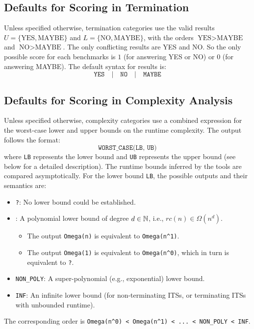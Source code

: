 \subsection{Defaults for Scoring in Termination}\label{scoring_termination}

Unless specified otherwise, termination categories use the valid results $U = \{\text{YES}, \text{MAYBE}\}$ and $L = \{\text{NO}, \text{MAYBE}\}$, with the orders $\text{YES} > \text{MAYBE}$ and $\text{NO} > \text{MAYBE}$.
%
The only conflicting results are YES and NO.
%
So the only possible score for each benchmarks is $1$ (for answering YES or NO) or $0$ (for answering MAYBE).
%
The default syntax for results is:
\[
  \texttt{YES} \quad | \quad \texttt{NO} \quad | \quad \texttt{MAYBE}
\]

\subsection{Defaults for Scoring in Complexity Analysis}\label{scoring_complexity}

Unless specified otherwise, complexity categories use a combined expression for the worst-case lower and upper bounds on the runtime complexity.
%
The output follows the format:
\[
  \texttt{WORST\_CASE(LB, UB)}
\]
where \texttt{LB} represents the lower bound and \texttt{UB} represents the upper bound (see below for a detailed description).
%
The runtime bounds inferred by the tools are compared asymptotically.
%
For the lower bound \texttt{LB}, the possible outputs and their semantics are:
\begin{itemize}
    \item \texttt{?}: No lower bound could be established.
    \item {}: A polynomial lower bound of degree $d \in \mathbb{N}$, i.e., $rc(n) \in \Omega(n^d)$.
      \begin{itemize}
      \item The output \texttt{Omega(n)} is equivalent to \texttt{Omega(n\textasciicircum 1)}.
      \item The output \texttt{Omega(1)} is equivalent to \texttt{Omega(n\textasciicircum 0)}, which in turn is equivalent to \texttt{?}.
      \end{itemize}
    \item \texttt{NON\_POLY}: A super-polynomial (e.g., exponential) lower bound.
    \item \texttt{INF}: An infinite lower bound (for non-terminating ITSs, or terminating ITSs with unbounded runtime).
\end{itemize}
%
The corresponding order is \texttt{Omega(n\textasciicircum 0) < Omega(n\textasciicircum 1) < ... < NON\_POLY < INF}.

